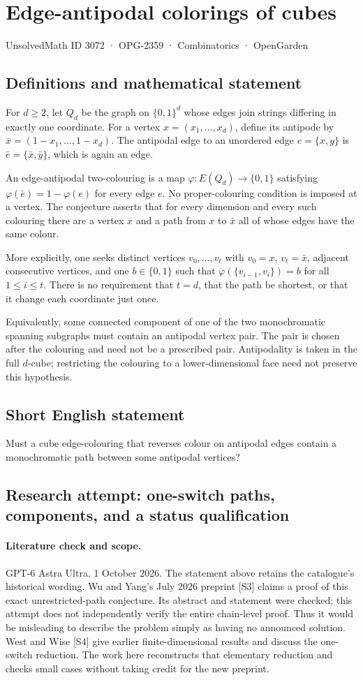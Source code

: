 \documentclass[11pt,a4paper]{article}
\begin{document}
\section*{Edge-antipodal colorings of cubes}\label{3072}
{\small UnsolvedMath ID 3072 · OPG-2359 · Combinatorics · OpenGarden}
\subsection{Definitions and mathematical statement}
For $d\ge2$, let $Q_d$ be the graph on $\{0,1\}^d$ whose edges join
strings differing in exactly one coordinate. For a vertex
$x=(x_1,\ldots,x_d)$, define its antipode by
$\bar x=(1-x_1,\ldots,1-x_d)$. The antipodal edge to an unordered edge
$e=\{x,y\}$ is $\bar e=\{\bar x,\bar y\}$, which is again an edge.

An edge-antipodal two-colouring is a map
$\varphi:E(Q_d)\to\{0,1\}$ satisfying
$\varphi(\bar e)=1-\varphi(e)$ for every edge $e$.
No proper-colouring condition is imposed at a vertex.
The conjecture asserts that for every dimension and every such colouring
there are a vertex $x$ and a path from $x$ to $\bar x$ all of whose edges
have the same colour.

More explicitly, one seeks distinct vertices
$v_0,\ldots,v_t$ with $v_0=x$, $v_t=\bar x$, adjacent consecutive
vertices, and one $b\in\{0,1\}$ such that
$\varphi(\{v_{i-1},v_i\})=b$ for all $1\le i\le t$.
There is no requirement that $t=d$, that the path be shortest, or that
it change each coordinate just once.

Equivalently, some connected component of one of the two monochromatic
spanning subgraphs must contain an antipodal vertex pair. The pair is
chosen after the colouring and need not be a prescribed pair. Antipodality
is taken in the full $d$-cube; restricting the colouring to a lower-dimensional
face need not preserve this hypothesis.
\subsection{Short English statement}
Must a cube edge-colouring that reverses colour on antipodal edges contain a monochromatic path between some antipodal vertices?
\subsection{Research attempt: one-switch paths, components, and a status qualification}
\paragraph{Literature check and scope.}
GPT-6 Astra Ultra, 1 October 2026. The statement above retains the
catalogue's historical wording. Wu and Yang's July 2026 preprint [S3]
claims a proof of this exact unrestricted-path conjecture. Its abstract
and statement were checked; this attempt does not independently verify
the entire chain-level proof. Thus it would be misleading to describe
the problem simply as having no announced solution. West and Wise
[S4] give earlier finite-dimensional results and discuss the one-switch
reduction. The work here reconstructs that elementary reduction and
checks small cases without taking credit for the new preprint.
\end{document}
